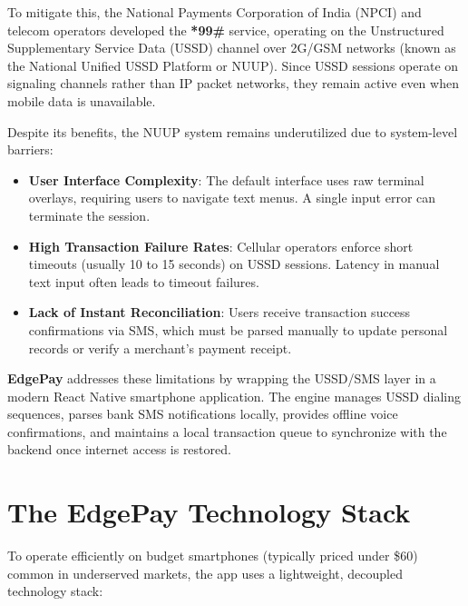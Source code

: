 \documentclass[10pt,journal,compsoc]{IEEEtran}
\begin{document}
To mitigate this, the National Payments Corporation of India (NPCI) and telecom operators developed the \textbf{*99\#} service, operating on the Unstructured Supplementary Service Data (USSD) channel over 2G/GSM networks (known as the National Unified USSD Platform or NUUP). Since USSD sessions operate on signaling channels rather than IP packet networks, they remain active even when mobile data is unavailable.

Despite its benefits, the NUUP system remains underutilized due to system-level barriers:
\begin{itemize}
    \item \textbf{User Interface Complexity}: The default interface uses raw terminal overlays, requiring users to navigate text menus. A single input error can terminate the session.
    \item \textbf{High Transaction Failure Rates}: Cellular operators enforce short timeouts (usually 10 to 15 seconds) on USSD sessions. Latency in manual text input often leads to timeout failures.
    \item \textbf{Lack of Instant Reconciliation}: Users receive transaction success confirmations via SMS, which must be parsed manually to update personal records or verify a merchant's payment receipt.
\end{itemize}

\textbf{EdgePay} addresses these limitations by wrapping the USSD/SMS layer in a modern React Native smartphone application. The engine manages USSD dialing sequences, parses bank SMS notifications locally, provides offline voice confirmations, and maintains a local transaction queue to synchronize with the backend once internet access is restored.

\section{The EdgePay Technology Stack}
To operate efficiently on budget smartphones (typically priced under \$60) common in underserved markets, the app uses a lightweight, decoupled technology stack:
\end{document}
